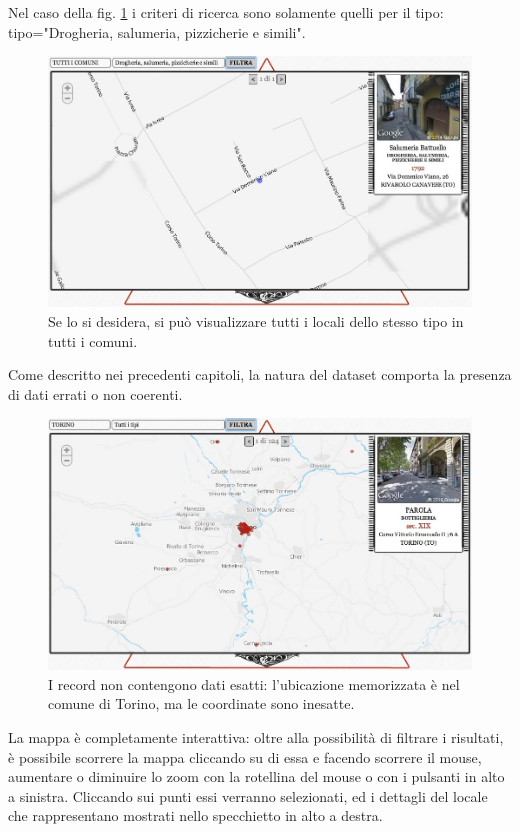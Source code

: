 Nel caso della fig. \ref{fig:solotipi} i criteri di ricerca sono solamente quelli per il tipo: tipo="Drogheria, salumeria, pizzicherie e simili".

\begin{figure}[ht!]
	\caption{Se lo si desidera, si pu\`o visualizzare tutti i locali dello stesso tipo in tutti i comuni.}
	\label{fig:solotipi}
	\centering
		\includegraphics[width=\textwidth]{img/s9.jpg}
\end{figure}

Come descritto nei precedenti capitoli, la natura del dataset comporta la presenza di dati errati o non coerenti.

\begin{figure}[ht!]
	\caption{I record non contengono dati esatti: l'ubicazione memorizzata \`e nel comune di Torino, ma le coordinate sono inesatte.}
	\centering
		\includegraphics[width=\textwidth]{img/s11.jpg}
\end{figure}

La mappa è completamente interattiva: oltre alla possibilità di filtrare i risultati, è possibile scorrere la mappa cliccando su di essa e facendo scorrere il mouse, aumentare o diminuire lo zoom con la rotellina del mouse o con i pulsanti in alto a sinistra. Cliccando sui punti essi verranno selezionati, ed i dettagli del locale che rappresentano mostrati nello specchietto in alto a destra.

